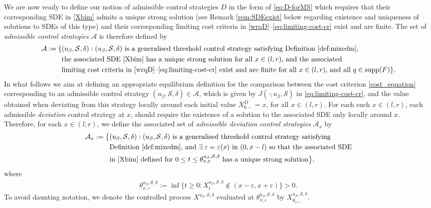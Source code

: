 \documentclass[11pt]{article} %
\numberwithin{komcounter}{section}
\renewcommand{\epsilon}{\varepsilon}
\begin{document}
We are now ready to define our notion of admissible control strategies $D$ in the form of \eqref{eq:D-forMS} which requires that their corresponding SDE in \eqref{Xbim} admits a unique strong solution (see Remark \ref{rem:SDEexist} below regarding existence and uniqueness of solutions to SDEs of this type) and their corresponding limiting cost criteria in \eqref{wrqD}--\eqref{eq:limiting-cost-cr} exist and are finite.   
The set of {\it admissible control strategies} $\mathcal{A}$ is therefore defined by
\begin{align} \label{adm-set}
\begin{split}
\mathcal{A} := \{ &(u_\beta,\mathcal{S},\delta) : (u_\beta,\mathcal{S},\delta) \text{ is a generalised threshold control strategy satisfying Definition \ref{def:mixedm},} \\
&\text{the associated SDE \eqref{Xbim} has a unique strong solution for all $x \in (l,r)$, and the associated} \\
&\text{limiting cost criteria in \eqref{wrqD}--\eqref{eq:limiting-cost-cr} exist and are finite for all $x \in (l,r)$,  and all $q\in {\rm supp}(F)$}\}.
\end{split}
\end{align}
In what follows we aim at defining an appropriate equilibrium definition for the comparison between the cost criterion \eqref{cost_equation} corresponding to an admissible control strategy $(u_\beta,\mathcal{S},\delta) \in \mathcal{A}$, which is given by $J(\cdot; u_\beta, \mathcal{S})$ in \eqref{eq:limiting-cost-cr}, 
and the value obtained when deviating from this strategy locally around each initial value $X^D_{0-}=x$, for all $x \in (l,r)$. 
For each such $x \in (l,r)$, each admissible \textit{deviation} control strategy at $x$, should require the existence of a solution to the associated SDE only locally around $x$. 
Therefore, for each $x \in (l,r)$, we define the associated set of {\it admissible deviation control strategies} $\mathcal{A}_x$ by
\begin{align} \label{adm-dev-set}
\begin{split}
\mathcal{A}_x := \big\{ &(u_\beta,\mathcal{S},\delta) : (u_\beta,\mathcal{S},\delta) \text{ is a generalised threshold control strategy satisfying} \\
&\text{Definition \ref{def:mixedm}, and $\exists\;\epsilon = \epsilon(x)$ in $(0,x-l)$ so that the associated SDE} \\
&\text{in \eqref{Xbim} defined for $0 \leq t \leq \theta^{u_\beta,\mathcal{S},\delta}_{x,\epsilon}$ has a unique strong solution} \big\},
\end{split}
\end{align}
 where 
\begin{align}\label{eq:tau-eps-stop}
\theta^{u_\beta,\mathcal{S},\delta}_{x,\epsilon} := 
\inf \big\{t\geq 0: X_t^{u_\beta,\mathcal{S},\delta} \notin (x-\epsilon,x+\epsilon)\big\} > 0. 
\end{align}
To avoid daunting notation, we denote the controlled process $X^{u_\beta,\mathcal{S},\delta}$ evaluated at $\theta^{u_\beta,\mathcal{S},\delta}_{x,\epsilon}$ by  $X_{\theta_{x,\epsilon}}^{u_\beta,\mathcal{S},\delta}$.
\end{document}
